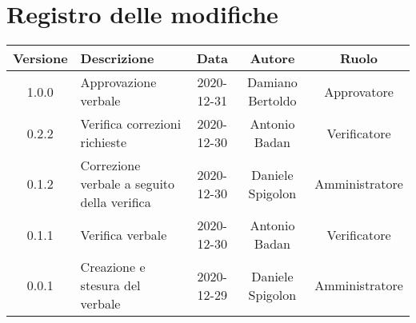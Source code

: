 \section*{Registro delle modifiche}

\begin{center}
	\begin{longtable}{|c|p{5cm}|c|c|c|}
	\hline
	\rowcolor{lighter-grayer}
	\textbf{Versione} & \textbf{Descrizione} & \textbf{Data} & \textbf{Autore} & \textbf{Ruolo} \\
	\hline
	\endfirsthead

	1.0.0 & Approvazione verbale & 2020-12-31 & Damiano Bertoldo & Approvatore \\
	\hline
	0.2.2 & Verifica correzioni richieste & 2020-12-30 & Antonio Badan & Verificatore \\
	\hline
	0.1.2 & Correzione verbale a seguito della verifica & 2020-12-30 & Daniele Spigolon & Amministratore \\
	\hline
	0.1.1 & Verifica verbale & 2020-12-30 & Antonio Badan & Verificatore \\
	\hline
	0.0.1 & Creazione e stesura del verbale & 2020-12-29 & Daniele Spigolon & Amministratore \\
	\hline
	\end{longtable}
\end{center}